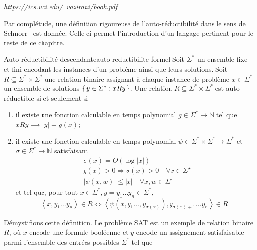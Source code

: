 \textcolor{mydarkred}{\textit{https://ics.uci.edu/~vazirani/book.pdf}}


Par complétude, une définition rigoureuse de l'auto-réductibilité dans le sens de Schnorr~\cite{schnorrOptimalAlgorithmsSelfReducible1976} est donnée. Celle-ci permet l'introduction d'un langage pertinent pour le reste de ce chapitre.
\begin{maindefinition}{Auto-réductibilité descendante}{auto-reductibilite-formel}
    Soit $\Sigma^{*}$ un ensemble fixe et fini encodant les instances d'un problème ainsi que leurs solutions. Soit $R \subseteq \Sigma^{*} \times \Sigma^{*}$ une relation binaire assignant à chaque instance de problème $x \in \Sigma^{*}$ un ensemble de solutions $\set{ y \in \Sigma^{*} : xRy }$. Une relation $R \subseteq \Sigma^{*} \times \Sigma^{*}$ est auto-réductible si et seulement si
    \begin{enumerate}
        \item il existe une fonction calculable en temps polynomial $g \in \Sigma^{*} \to \mathbb{N}$ tel que $xRy \implies \lvert y \rvert = g(x)$;
        \item il existe une fonction calculable en temps polynomial $\psi \in \Sigma^{*} \times \Sigma^{*} \to \Sigma^{*}$ et $\sigma \in \Sigma^{*} \to \mathbb{N}$ satisfaisant
        \begin{align*}
            & \sigma(x)=O(\log |x|) \\
            & g(x)>0 \Rightarrow \sigma(x)>0 \quad \forall x \in \Sigma^{\star} \\
            & |\psi(x, w)| \leqslant|x| \quad \forall x, w \in \Sigma^{\star}
        \end{align*}
        et tel que, pour tout $x \in \Sigma^{*}, y=y_1 \ldots y_n \in \Sigma^{*}$, 
        \begin{equation*}
            \left\langle x, y_1 \ldots y_n \right\rangle \in R \Leftrightarrow \left\langle \psi \left( x, y_1 \ldots, y_{\sigma(x)} \right), y_{\sigma(x)+1} \ldots y_n \right\rangle \in R
        \end{equation*}
    \end{enumerate}
\end{maindefinition}

Démystifions cette définition. Le problème SAT est un exemple de relation binaire $R$, où $x$ encode une formule booléenne et $y$ encode un assignement satisfaisable parmi l'ensemble des entrées possibles $\Sigma^{*}$ tel que

